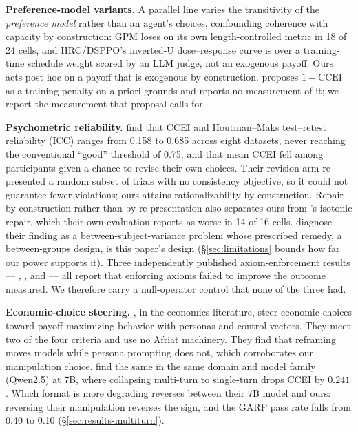 \documentclass{article}
\begin{document}
\textbf{Preference-model variants.} A parallel line varies the transitivity of the
\emph{preference model} rather than an agent's choices, confounding coherence with capacity by
construction: GPM \citep{zhang2025gpm} loses on its own length-controlled metric in 18 of 24
cells, and HRC/DSPPO's \citep{huang2026hrc} inverted-U dose--response curve is over a
training-time schedule weight scored by an LLM judge, not an exogenous payoff. Ours acts post hoc
on a payoff that is exogenous by construction. \citet{andrews2026revealed} proposes
$1-\mathrm{CCEI}$ as a training penalty on a priori grounds and reports no measurement of it; we
report the measurement that proposal calls for.

\textbf{Psychometric reliability.}
\citet{nitsch2022reliability} find that CCEI and Houtman--Maks \citep{houtman1985determining}
test--retest reliability (ICC) ranges from 0.158 to 0.685 across eight datasets, never reaching
the conventional ``good'' threshold of 0.75, and that mean CCEI fell among
participants given a chance to revise their own choices. Their revision arm re-presented a random
subset of trials with no consistency objective, so it could not guarantee fewer violations; ours
attains rationalizability by construction. Repair by construction rather than by re-presentation
also separates ours from \citet{yamin2026elicited}'s isotonic repair, which their own evaluation
reports as worse in 14 of 16 cells. \citeauthor{nitsch2022reliability} diagnose
their finding as a between-subject-variance problem whose prescribed remedy, a between-groups
design, is this paper's design (\S\ref{sec:limitations} bounds how far our power supports it).
Three independently published axiom-enforcement results --- \citet{nitsch2022reliability},
\citet{yamin2026elicited}, and \citet{zhu2025axiomatic} --- all report that enforcing axioms
failed to improve the outcome measured. We therefore carry a null-operator control that none of
the three had.

\textbf{Economic-choice steering.} \citet{cook2026whatllmswant}, in the economics literature,
steer economic choices toward payoff-maximizing behavior with personas and control vectors. They
meet two of the four criteria and use no Afriat machinery. They find that reframing moves models
while persona prompting does not, which corroborates our manipulation choice.
\citet{wang2025tactics} find the same in the same domain and model family (Qwen2.5) at 7B, where
collapsing multi-turn to single-turn drops CCEI by $0.241$. Which format is more degrading
reverses between their 7B model and ours: reversing their manipulation reverses the sign, and the
GARP pass rate falls from 0.40 to 0.10 (\S\ref{sec:results-multiturn}).
\end{document}
